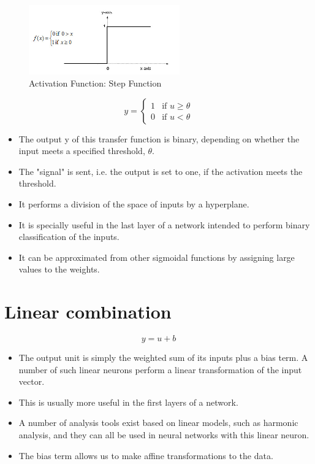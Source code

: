 \begin{figure}[H]
    \centering
    \includegraphics[height=3cm]{Pictures/activation-fns/step-function.jpg}
    \caption{Activation Function: Step Function}
\end{figure}

\[
    y={\begin{cases}1&{\text{if }}u\geq \theta \\0&{\text{if }}u<\theta \end{cases}}
\]

\begin{itemize}
    \item The output y of this transfer function is binary, depending on whether the input meets a specified threshold, $\theta$. 
    \item The "signal" is sent, i.e. the output is set to one, if the activation meets the threshold.
    \item It performs a division of the space of inputs by a hyperplane. 
    \item It is specially useful in the last layer of a network intended to perform binary classification of the inputs. 
    \item It can be approximated from other sigmoidal functions by assigning large values to the weights.
\end{itemize}


\section{Linear combination \cite{wiki-Artificial_neuron}}
\[
    y = u + b
\]

\begin{itemize}
    \item The output unit is simply the weighted sum of its inputs plus a bias term. A number of such linear neurons perform a linear transformation of the input vector. 
    \item This is usually more useful in the first layers of a network. 
    \item A number of analysis tools exist based on linear models, such as harmonic analysis, and they can all be used in neural networks with this linear neuron. 
    \item The bias term allows us to make affine transformations to the data.
\end{itemize}



